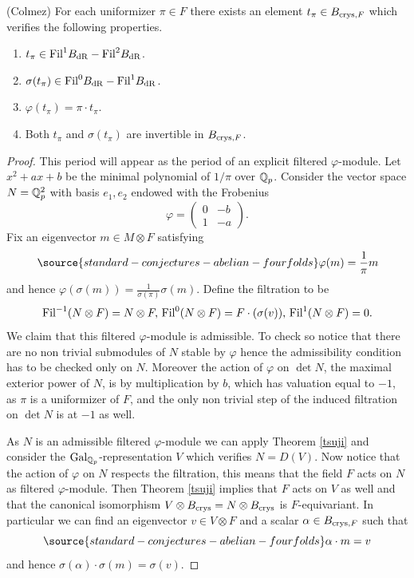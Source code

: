 \begin{prop}
\notready\label{lubintateram} (Colmez)
For each uniformizer $\pi \in F$ there exists an element $t_\pi \in B_{\textnormal{crys},F}$  which verifies the following properties.
\begin{enumerate}
\item $t_\pi \in \textnormal{Fil} ^{1} B_{\mathrm{dR}}-\textnormal{Fil} ^{2} B_{\mathrm{dR}}$.
\item $\sigma (t_\pi) \in \textnormal{Fil} ^{0} B_{\mathrm{dR}}-\textnormal{Fil} ^{1} B_{\mathrm{dR}}$.
\item  $ \varphi(t_\pi) = \pi  \cdot t_\pi$.
\item Both $t_\pi $ and  $ \sigma(t_\pi) $ are invertible in $B_{\textnormal{crys},F}$.
\end{enumerate}
\end{prop}
\begin{proof}
This period will appear as the period of an explicit filtered $\varphi$-module. Let $x^2+ax+b$ be the minimal polynomial of $1/\pi$ over $\mathbb{Q}_p$. Consider the vector space  $N=\mathbb{Q}_p^2$ with basis $e_1,e_2$ endowed with the Frobenius
\[
\varphi =  \begin{pmatrix} 0 & -b \\
1 & -a
 \end{pmatrix}.
 \]
 Fix an eigenvector $m \in M \otimes F$ satisfying
 \begin{equation}\label{disarli2}
\source{standard-conjectures-abelian-fourfolds}
\varphi (m)=  \frac{1}{\pi} m
 \end{equation}
 and hence
  $
\varphi (\sigma(m))=  \frac{1}{\sigma(\pi)} \sigma(m).
 $
 Define the filtration to be \[\textnormal{Fil}^{-1} (N\otimes F)=N\otimes F, \, \textnormal{Fil}^0 (N\otimes F)= F\cdot ( \sigma(v)), \, \textnormal{Fil}^{1} (N\otimes F)=0.\] We claim that this filtered $\varphi$-module is admissible. To check so notice that there are no non trivial submodules of $N$ stable by $\varphi$ hence the admissibility condition has to be checked only on $N$. Moreover the action of $\varphi$ on $\det N$, the maximal exterior power of $N$, is by multiplication by $b$, which has valuation equal to $-1$, as $\pi$ is a uniformizer of $F$, and the only non trivial step of the induced filtration on $\det N$ is at $-1$ as well.

  As $N$ is an admissible filtered $\varphi$-module we can apply Theorem \ref{tsuji} and consider the $\textnormal{Gal}_{\mathbb{Q}_p}$-representation $V$ which verifies  $N=D(V)$. Now notice that the action of $\varphi$ on $N$ respects the filtration, this means that the field $F$ acts on $N$ as filtered $\varphi$-module. Then Theorem \ref{tsuji}  implies that
 $F$ acts on $V$ as well and that the canonical isomorphism  $V \otimes B_{\textnormal{crys}}= N \otimes B_{\textnormal{crys}}$ is $F$-equivariant. In particular we can find an eigenvector $v \in V \otimes F$ and a scalar $\alpha \in B_{\textnormal{crys},F}$ such that
  \begin{equation}\label{disarli4}
\source{standard-conjectures-abelian-fourfolds}
\alpha \cdot m=   v
 \end{equation}
 and hence $ \sigma(\alpha) \cdot \sigma(m)=   \sigma(v)$.


\end{proof}
